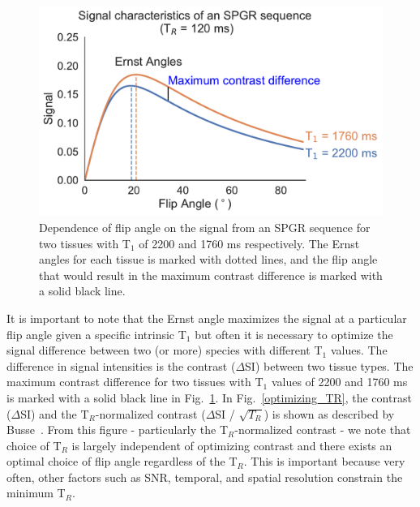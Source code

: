 \begin{figure}[htbp]
   \centering
   \includegraphics[width=\textwidth]{intro/intro-images/SPGR_plot.pdf}
   \caption{Dependence of flip angle on the signal from an SPGR sequence for two tissues with T$_1$ of 2200 and 1760 ms respectively. The Ernst angles for each tissue is marked with dotted lines, and the flip angle that would result in the maximum contrast difference is marked with a solid black line.}
   \label{spgr_plot}
\end{figure}

It is important to note that the Ernst angle maximizes the signal at a particular flip angle given a specific intrinsic T$_1$ but often it is necessary to optimize the signal difference between two (or more) species with different T$_1$ values.
The difference in signal intensities is the contrast ($\Delta$SI) between two tissue types. 
The maximum contrast difference for two tissues with T$_1$ values of 2200 and 1760 ms is marked with a solid black line in Fig.~\ref{spgr_plot}.
In Fig.~\ref{optimizing_TR}, the contrast ($\Delta$SI) and the T$_R$-normalized contrast ($\Delta$SI / $\sqrt{T_R}$) is shown as described by Busse~\cite{Busse:2005jt}.
From this figure - particularly the T$_R$-normalized contrast - we note that choice of T$_R$ is largely independent of optimizing contrast and there exists an optimal choice of flip angle regardless of the T$_R$.
This is important because very often, other factors such as SNR, temporal, and spatial resolution constrain the minimum T$_R$. 

